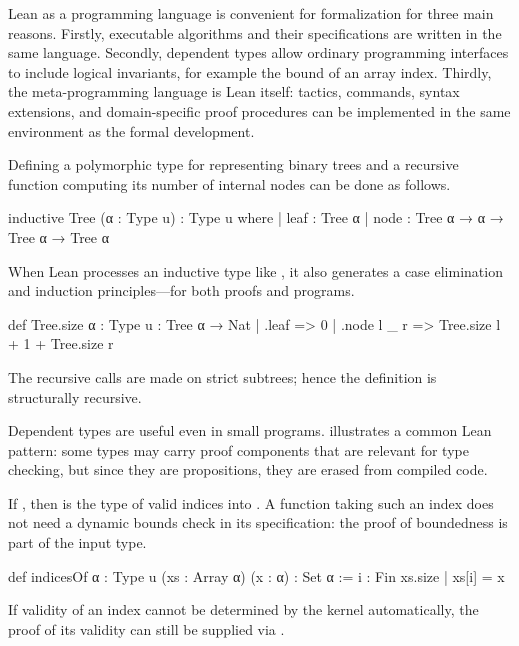 Lean as a programming language is convenient for formalization for three main reasons.
Firstly, executable algorithms and their specifications are written in the same
language.
Secondly, dependent types allow ordinary programming interfaces to
include logical invariants, for example the bound of an array index.
Thirdly, the meta-programming language is Lean itself: tactics, commands, syntax
extensions, and domain-specific proof procedures can be implemented in the same
environment as the formal development.

\begin{example}
Defining a polymorphic type for representing binary trees and a recursive function computing its number of internal nodes can be done as follows.

\begin{leanlisting}
inductive Tree (α : Type u) : Type u where
  | leaf : Tree α
  | node : Tree α → α → Tree α → Tree α
\end{leanlisting}

When Lean processes an inductive type like , it also generates a case elimination and induction principles---for both proofs and programs.

\begin{leanlisting}
def Tree.size {α : Type u} : Tree α → Nat
  | .leaf => 0
  | .node l _ r => Tree.size l + 1 + Tree.size r
\end{leanlisting}
The recursive calls are made on strict subtrees; hence the definition is structurally recursive.
\end{example}

Dependent types are useful even in small programs.
 illustrates a common Lean pattern: some types may carry proof components that are relevant for type checking, but since they are propositions, they are erased from compiled code.

\begin{example}
\label{ex:array-bounds}
If ,
then  is the type of valid indices into .  A
function taking such an index does not need a dynamic bounds check in its
specification: the proof of boundedness is part of the input type.

\begin{leanlisting}
def indicesOf {α : Type u} (xs : Array α) (x : α) : Set α :=
  { i : Fin xs.size | xs[i] = x }
\end{leanlisting}

If validity of an index cannot be determined by the kernel automatically, the proof of its validity can still be supplied via
.

\end{example}

